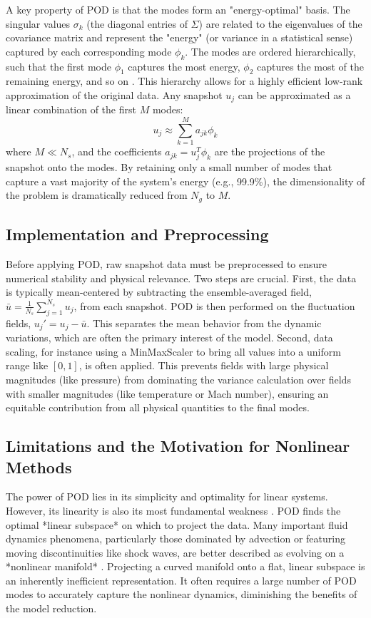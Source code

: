 \documentclass[dsc, EN]{ufabcFHZh}
\begin{document}
A key property of POD is that the modes form an "energy-optimal" basis. The singular values $\sigma_k$ (the diagonal entries of $\Sigma$) are related to the eigenvalues of the covariance matrix and represent the "energy" (or variance in a statistical sense) captured by each corresponding mode $\phi_k$. The modes are ordered hierarchically, such that the first mode $\phi_1$ captures the most energy, $\phi_2$ captures the most of the remaining energy, and so on \citep{cazemier1998proper}. This hierarchy allows for a highly efficient low-rank approximation of the original data. Any snapshot $u_j$ can be approximated as a linear combination of the first $M$ modes:
$$u_j \approx \sum_{k=1}^{M} a_{jk} \phi_k$$
where $M \ll N_s$, and the coefficients $a_{jk} = u_j^T \phi_k$ are the projections of the snapshot onto the modes. By retaining only a small number of modes that capture a vast majority of the system's energy (e.g., 99.9\%), the dimensionality of the problem is dramatically reduced from $N_g$ to $M$.

\subsection{Implementation and Preprocessing}

Before applying POD, raw snapshot data must be preprocessed to ensure numerical stability and physical relevance. Two steps are crucial. First, the data is typically mean-centered by subtracting the ensemble-averaged field, $\bar{u} = \frac{1}{N_s}\sum_{j=1}^{N_s} u_j$, from each snapshot. POD is then performed on the fluctuation fields, $u_j' = u_j - \bar{u}$. This separates the mean behavior from the dynamic variations, which are often the primary interest of the model. Second, data scaling, for instance using a MinMaxScaler to bring all values into a uniform range like $[0,1]$, is often applied. This prevents fields with large physical magnitudes (like pressure) from dominating the variance calculation over fields with smaller magnitudes (like temperature or Mach number), ensuring an equitable contribution from all physical quantities to the final modes.

\subsection{Limitations and the Motivation for Nonlinear Methods}

The power of POD lies in its simplicity and optimality for linear systems. However, its linearity is also its most fundamental weakness \citep{carlberg2018nonlinear}. POD finds the optimal *linear subspace* on which to project the data. Many important fluid dynamics phenomena, particularly those dominated by advection or featuring moving discontinuities like shock waves, are better described as evolving on a *nonlinear manifold* \citep{geelen2022nonlinear}. Projecting a curved manifold onto a flat, linear subspace is an inherently inefficient representation. It often requires a large number of POD modes to accurately capture the nonlinear dynamics, diminishing the benefits of the model reduction.
\end{document}
